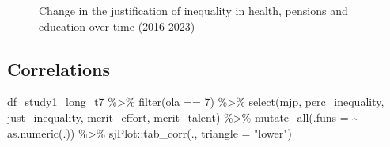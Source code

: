 \documentclass[
  12pt,
  letterpaper,
  DIV=11,
  numbers=noendperiod]{scrartcl}
\newenvironment{Shaded}{\begin{snugshade}}{\end{snugshade}}
\newcommand{\AttributeTok}[1]{\textcolor[rgb]{0.40,0.45,0.13}{#1}}
\newcommand{\DecValTok}[1]{\textcolor[rgb]{0.68,0.00,0.00}{#1}}
\newcommand{\FunctionTok}[1]{\textcolor[rgb]{0.28,0.35,0.67}{#1}}
\newcommand{\NormalTok}[1]{\textcolor[rgb]{0.00,0.23,0.31}{#1}}
\newcommand{\SpecialCharTok}[1]{\textcolor[rgb]{0.37,0.37,0.37}{#1}}
\newcommand{\StringTok}[1]{\textcolor[rgb]{0.13,0.47,0.30}{#1}}
\begin{document}
\begin{figure}[H]

\caption{\label{fig-alluvial}Change in the justification of inequality
in health, pensions and education over time (2016-2023)}


\end{figure}%

\subsection{Correlations}\label{correlations}

\begin{Shaded}
\begin{Highlighting}[]
\NormalTok{df\_study1\_long\_t7 }\SpecialCharTok{\%\textgreater{}\%}
  \FunctionTok{filter}\NormalTok{(ola }\SpecialCharTok{==} \DecValTok{7}\NormalTok{) }\SpecialCharTok{\%\textgreater{}\%} 
  \FunctionTok{select}\NormalTok{(mjp, perc\_inequality, just\_inequality, merit\_effort, merit\_talent) }\SpecialCharTok{\%\textgreater{}\%} 
  \FunctionTok{mutate\_all}\NormalTok{(}\AttributeTok{.funs =} \SpecialCharTok{\textasciitilde{}} \FunctionTok{as.numeric}\NormalTok{(.)) }\SpecialCharTok{\%\textgreater{}\%} 
\NormalTok{  sjPlot}\SpecialCharTok{::}\FunctionTok{tab\_corr}\NormalTok{(., }\AttributeTok{triangle =} \StringTok{"lower"}\NormalTok{)}
\end{Highlighting}
\end{Shaded}
\end{document}
